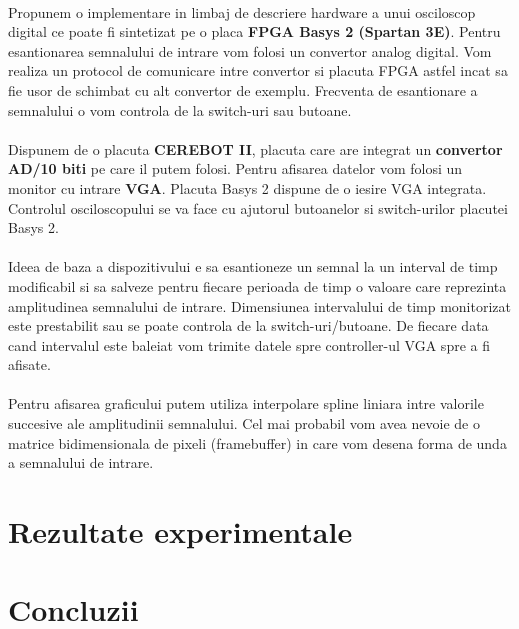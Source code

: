 \documentclass[10pt,a4paper]{article}
\begin{document}
\paragraph{}
Propunem o implementare in limbaj de descriere hardware a unui osciloscop digital ce poate fi sintetizat pe o placa \textbf{FPGA Basys 2 (Spartan 3E)}. Pentru esantionarea semnalului de intrare vom folosi un convertor analog digital. Vom realiza un protocol de comunicare intre convertor si placuta FPGA astfel incat sa fie usor de schimbat cu alt convertor de exemplu. Frecventa de esantionare a semnalului o vom controla de la switch-uri sau butoane. 
\paragraph{}
Dispunem de o placuta \textbf{CEREBOT II}, placuta care are integrat un  \textbf{convertor AD/10 biti} pe care il putem folosi. Pentru afisarea datelor vom folosi un monitor cu intrare \textbf{VGA}. Placuta Basys 2 dispune de o iesire VGA integrata. Controlul osciloscopului se va face cu ajutorul butoanelor si switch-urilor placutei Basys 2.
\paragraph{}
Ideea de baza a dispozitivului e sa esantioneze un semnal la un interval de timp modificabil si sa salveze pentru fiecare perioada de timp o valoare care reprezinta amplitudinea semnalului de intrare. Dimensiunea intervalului de timp monitorizat este prestabilit sau se poate controla de la switch-uri/butoane. De fiecare data cand intervalul este baleiat vom trimite datele spre controller-ul VGA spre a fi afisate. 
\paragraph{}
Pentru afisarea graficului putem utiliza interpolare spline liniara intre valorile succesive ale amplitudinii semnalului. Cel mai probabil vom avea nevoie de o matrice bidimensionala de pixeli (framebuffer) in care vom desena forma de unda a semnalului de intrare.

\clearpage

\section{Rezultate experimentale}

\clearpage

\section{Concluzii}

\clearpage


\end{document}
